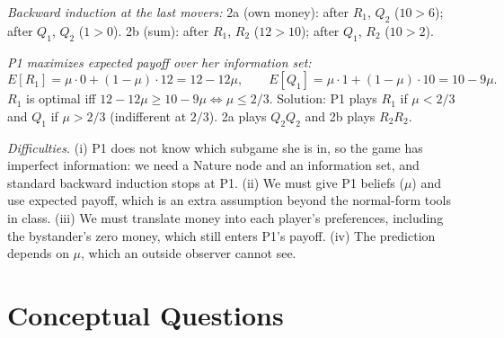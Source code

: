 \begin{description}
\begin{solution}
\emph{Backward induction at the last movers:}
2a (own money): after $R_1$, $Q_2$ ($10>6$); after $Q_1$, $Q_2$ ($1>0$).
2b (sum): after $R_1$, $R_2$ ($12>10$); after $Q_1$, $R_2$ ($10>2$).

\emph{P1 maximizes expected payoff over her information set:}
\[E[R_1]=\mu\cdot0+(1-\mu)\cdot12=12-12\mu,\qquad E[Q_1]=\mu\cdot1+(1-\mu)\cdot10=10-9\mu.\]
$R_1$ is optimal iff $12-12\mu\ge10-9\mu\iff\mu\le2/3$. Solution: P1 plays $R_1$ if $\mu<2/3$ and $Q_1$ if $\mu>2/3$ (indifferent at $2/3$). 2a plays $Q_2Q_2$ and 2b plays $R_2R_2$.

\emph{Difficulties.} (i) P1 does not know which subgame she is in, so the game has imperfect information: we need a Nature node and an information set, and standard backward induction stops at P1. (ii) We must give P1 beliefs ($\mu$) and use expected payoff, which is an extra assumption beyond the normal-form tools in class. (iii) We must translate money into each player's preferences, including the bystander's zero money, which still enters P1's payoff. (iv) The prediction depends on $\mu$, which an outside observer cannot see.
\end{solution}
\end{description}

\section{Conceptual Questions}


